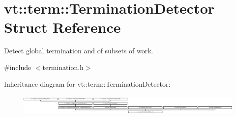 \hypertarget{structvt_1_1term_1_1_termination_detector}{}\section{vt\+:\+:term\+:\+:Termination\+Detector Struct Reference}
\label{structvt_1_1term_1_1_termination_detector}


Detect global termination and of subsets of work.  




{\ttfamily \#include $<$termination.\+h$>$}

Inheritance diagram for vt\+:\+:term\+:\+:Termination\+Detector\+:\begin{figure}[H]
\begin{center}
\leavevmode
\includegraphics[height=1.066667cm]{structvt_1_1term_1_1_termination_detector}
\end{center}
\end{figure}
